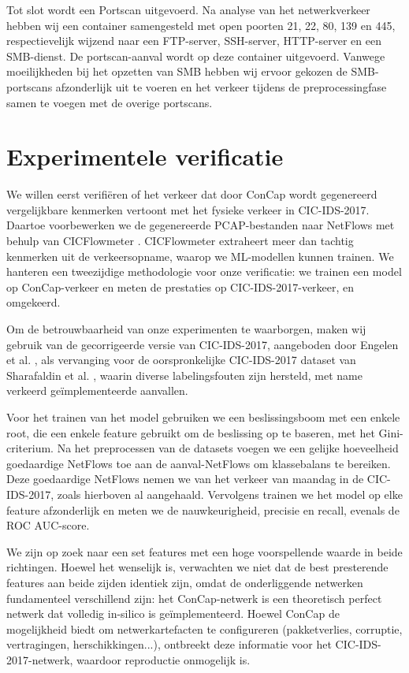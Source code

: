 \documentclass[conference]{IEEEtran}
\begin{document}
	Tot slot wordt een Portscan uitgevoerd. Na analyse van het netwerkverkeer hebben wij een container samengesteld met open poorten 21, 22, 80, 139 en 445, respectievelijk wijzend naar een FTP-server, SSH-server, HTTP-server en een SMB-dienst. De portscan-aanval wordt op deze container uitgevoerd. Vanwege moeilijkheden bij het opzetten van SMB hebben wij ervoor gekozen de SMB-portscans afzonderlijk uit te voeren en het verkeer tijdens de preprocessingfase samen te voegen met de overige portscans.
	
	
	\section{Experimentele verificatie}\label{verification}
	
	We willen eerst verifiëren of het verkeer dat door ConCap wordt gegenereerd vergelijkbare kenmerken vertoont met het fysieke verkeer in CIC-IDS-2017. Daartoe voorbewerken we de gegenereerde PCAP-bestanden naar NetFlows met behulp van CICFlowmeter \cite{cicflowmeter}. CICFlowmeter extraheert meer dan tachtig kenmerken uit de verkeersopname, waarop we ML-modellen kunnen trainen. We hanteren een tweezijdige methodologie voor onze verificatie: we trainen een model op ConCap-verkeer en meten de prestaties op CIC-IDS-2017-verkeer, en omgekeerd.
	
	Om de betrouwbaarheid van onze experimenten te waarborgen, maken wij gebruik van de gecorrigeerde versie van CIC-IDS-2017, aangeboden door Engelen et al. \cite{troubleshooting_cic2017}, als vervanging voor de oorspronkelijke CIC-IDS-2017 dataset van Sharafaldin et al. \cite{cic_2017}, waarin diverse labelingsfouten zijn hersteld, met name verkeerd geïmplementeerde aanvallen.
	
	Voor het trainen van het model gebruiken we een beslissingsboom met een enkele root, die een enkele feature gebruikt om de beslissing op te baseren, met het Gini-criterium. Na het preprocessen van de datasets voegen we een gelijke hoeveelheid goedaardige NetFlows toe aan de aanval-NetFlows om klassebalans te bereiken. Deze goedaardige NetFlows nemen we van het verkeer van maandag in de CIC-IDS-2017, zoals hierboven al aangehaald. Vervolgens trainen we het model op elke feature afzonderlijk en meten we de nauwkeurigheid, precisie en recall, evenals de ROC AUC-score.
	
	We zijn op zoek naar een set features met een hoge voorspellende waarde in beide richtingen. Hoewel het wenselijk is, verwachten we niet dat de best presterende features aan beide zijden identiek zijn, omdat de onderliggende netwerken fundamenteel verschillend zijn: het ConCap-netwerk is een theoretisch perfect netwerk dat volledig in-silico is geïmplementeerd. Hoewel ConCap de mogelijkheid biedt om netwerkartefacten te configureren (pakketverlies, corruptie, vertragingen, herschikkingen...), ontbreekt deze informatie voor het CIC-IDS-2017-netwerk, waardoor reproductie onmogelijk is.
	
\end{document}
